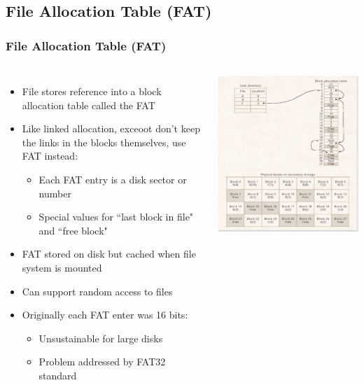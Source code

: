 \documentclass{beamer}
\begin{document}
\subsection{File Allocation Table (FAT)}
\begin{frame}
\frametitle{File Allocation Table (FAT)}
\begin{columns}[c]
\begin{itemize}
\tiny
\item File stores reference into a block allocation table called the FAT
\item Like linked allocation, exceoot don't keep the links in the blocks themselves, use FAT instead:
\begin{itemize}
\tiny
\item Each FAT entry is a disk sector or number
\item Special values for ``last block in file" and ``free block"
\end{itemize}
\item FAT stored on disk but cached when file system is mounted
\item Can support random access to files
\item Originally each FAT enter was 16 bits:
\begin{itemize}
\tiny
\item Unsustainable for large disks
\item Problem addressed by FAT32 standard
\end{itemize}
\end{itemize}
\includegraphics[scale=0.35]{fat.png}
\end{columns}
\end{frame}
\end{document}
